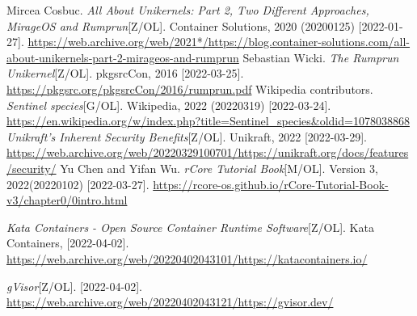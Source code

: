 \documentclass{../runikraft-report}
\begin{document}
\begin{thebibliography}{99}
 Mircea Cosbuc. \textit{All About Unikernels: Part 2, Two Different Approaches, MirageOS and Rumprun}[Z/OL]. Container Solutions, 2020 (20200125) [2022-01-27]. \url{https://web.archive.org/web/2021*/https://blog.container-solutions.com/all-about-unikernels-part-2-mirageos-and-rumprun}
 Sebastian Wicki. \textit{The Rumprun Unikernel}[Z/OL]. pkgsrcCon, 2016
[2022-03-25]. \url{https://pkgsrc.org/pkgsrcCon/2016/rumprun.pdf}
 Wikipedia contributors. \textit{Sentinel species}[G/OL]. Wikipedia, 2022 (20220319) [2022-03-24]. \url{https://en.wikipedia.org/w/index.php?title=Sentinel_species&oldid=1078038868}
 \textit{Unikraft's Inherent Security Benefits}[Z/OL]. Unikraft, 2022 [2022-03-29]. \url{https://web.archive.org/web/20220329100701/https://unikraft.org/docs/features/security/}
 Yu Chen and Yifan Wu. \textit{rCore Tutorial Book}[M/OL]. Version 3,
2022(20220102) [2022-03-27]. \url{https://rcore-os.github.io/rCore-Tutorial-Book-v3/chapter0/0intro.html}

 \textit{Kata Containers - Open Source Container Runtime Software}[Z/OL].
Kata Containers, [2022-04-02]. \url{https://web.archive.org/web/20220402043101/https://katacontainers.io/}

 \textit{gVisor}[Z/OL]. [2022-04-02]. \url{https://web.archive.org/web/20220402043121/https://gvisor.dev/}


\end{thebibliography}
\end{document}
